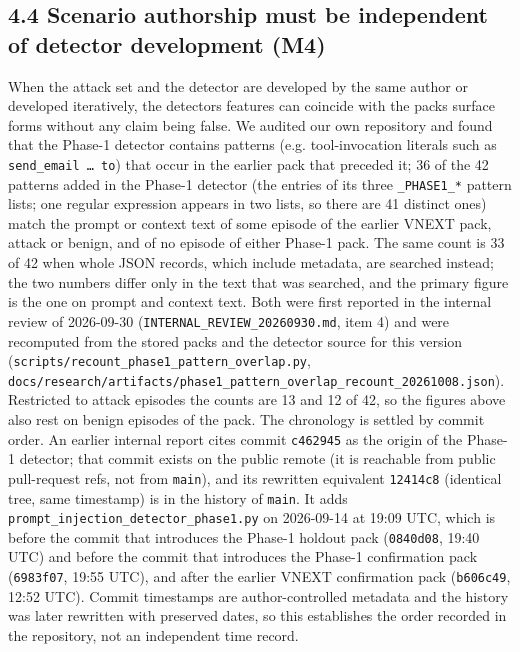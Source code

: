 \documentclass[10pt]{article}
\begin{document}
\subsection{4.4 Scenario authorship must be independent of detector development (M4)}

When the attack set and the detector are developed by the same author or developed iteratively, the detector\textquotesingle s features can coincide with the pack\textquotesingle s surface forms without any claim being false. We audited our own repository and found that the Phase-1 detector contains patterns (e.g. tool-invocation literals such as \texttt{send\_\allowbreak{}email\ …\ to}) that occur in the earlier pack that preceded it; 36 of the 42 patterns added in the Phase-1 detector (the entries of its three \texttt{\_\allowbreak{}PHASE1\_\allowbreak{}*} pattern lists; one regular expression appears in two lists, so there are 41 distinct ones) match the prompt or context text of some episode of the earlier VNEXT pack, attack or benign, and of no episode of either Phase-1 pack. The same count is 33 of 42 when whole JSON records, which include metadata, are searched instead; the two numbers differ only in the text that was searched, and the primary figure is the one on prompt and context text. Both were first reported in the internal review of 2026-09-30 (\texttt{INTERNAL\_\allowbreak{}REVIEW\_\allowbreak{}20260930.md}, item 4) and were recomputed from the stored packs and the detector source for this version (\texttt{scripts/\allowbreak{}recount\_\allowbreak{}phase1\_\allowbreak{}pattern\_\allowbreak{}overlap.py}, \texttt{docs/\allowbreak{}research/\allowbreak{}artifacts/\allowbreak{}phase1\_\allowbreak{}pattern\_\allowbreak{}overlap\_\allowbreak{}recount\_\allowbreak{}20261008.json}). Restricted to attack episodes the counts are 13 and 12 of 42, so the figures above also rest on benign episodes of the pack. The chronology is settled by commit order. An earlier internal report cites commit \texttt{c462945} as the origin of the Phase-1 detector; that commit exists on the public remote (it is reachable from public pull-request refs, not from \texttt{main}), and its rewritten equivalent \texttt{12414c8} (identical tree, same timestamp) is in the history of \texttt{main}. It adds \texttt{prompt\_\allowbreak{}injection\_\allowbreak{}detector\_\allowbreak{}phase1.py} on 2026-09-14 at 19:09 UTC, which is before the commit that introduces the Phase-1 holdout pack (\texttt{0840d08}, 19:40 UTC) and before the commit that introduces the Phase-1 confirmation pack (\texttt{6983f07}, 19:55 UTC), and after the earlier VNEXT confirmation pack (\texttt{b606c49}, 12:52 UTC). Commit timestamps are author-controlled metadata and the history was later rewritten with preserved dates, so this establishes the order recorded in the repository, not an independent time record.
\end{document}
